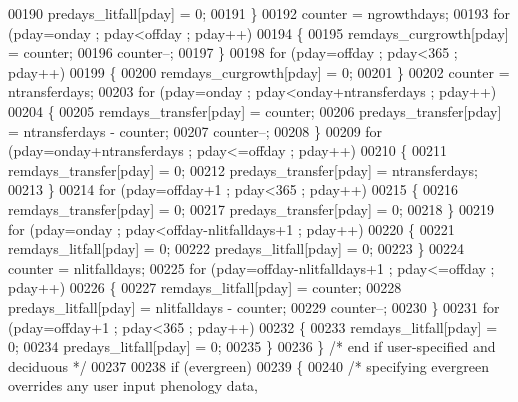 \begin{DoxyCode}
{{00190                     predays\_litfall[pday] = 0;
00191                 \}
00192                 counter = ngrowthdays;
00193                 \textcolor{keywordflow}{for} (pday=onday ; pday<offday ; pday++)
00194                 \{
00195                     remdays\_curgrowth[pday] = counter;
00196                     counter--;
00197                 \}
00198                 \textcolor{keywordflow}{for} (pday=offday ; pday<365 ; pday++)
00199                 \{
00200                     remdays\_curgrowth[pday] = 0;
00201                 \}
00202                 counter = ntransferdays;
00203                 \textcolor{keywordflow}{for} (pday=onday ; pday<onday+ntransferdays ; pday++)
00204                 \{
00205                     remdays\_transfer[pday] = counter;
00206                     predays\_transfer[pday] = ntransferdays - counter;
00207                     counter--;
00208                 \}
00209                 \textcolor{keywordflow}{for} (pday=onday+ntransferdays ; pday<=offday ; pday++)
00210                 \{
00211                     remdays\_transfer[pday] = 0;
00212                     predays\_transfer[pday] = ntransferdays;
00213                 \}
00214                 \textcolor{keywordflow}{for} (pday=offday+1 ; pday<365 ; pday++)
00215                 \{
00216                     remdays\_transfer[pday] = 0;
00217                     predays\_transfer[pday] = 0;
00218                 \}
00219                 \textcolor{keywordflow}{for} (pday=onday ; pday<offday-nlitfalldays+1 ; pday++)
00220                 \{
00221                     remdays\_litfall[pday] = 0;
00222                     predays\_litfall[pday] = 0;
00223                 \}
00224                 counter = nlitfalldays;
00225                 \textcolor{keywordflow}{for} (pday=offday-nlitfalldays+1 ; pday<=offday ; pday++)
00226                 \{
00227                     remdays\_litfall[pday] = counter;
00228                     predays\_litfall[pday] = nlitfalldays - counter;
00229                     counter--;
00230                 \}
00231                 \textcolor{keywordflow}{for} (pday=offday+1 ; pday<365 ; pday++)
00232                 \{
00233                     remdays\_litfall[pday] = 0;
00234                     predays\_litfall[pday] = 0;
00235                 \}
00236             \} \textcolor{comment}{/* end if user-specified and deciduous */}
00237 
00238             \textcolor{keywordflow}{if} (evergreen)
00239             \{   
00240                 \textcolor{comment}{/* specifying evergreen overrides any user input phenology data,}
}}
\end{DoxyCode}
